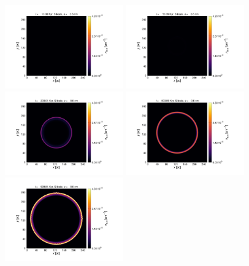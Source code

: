 \documentclass[fleqn,usenatbib]{mnras}
\begin{document}
\begin{figure}
  \includegraphics[trim=2.8cm 1.5cm 9.3cm 2.0cm, clip=true,page=2,height = 3.6cm]{Pics/Pics_A2/Density_1_00041.pdf}\hspace*{-0.05cm} 
 \includegraphics[trim=5.2cm 1.5cm 9.3cm 2.0cm, clip=true,page=2,height = 3.6cm]{Pics/Pics_A2/Density_1_00201.pdf}\hspace*{-0.05cm} 
 \includegraphics[trim=5.2cm 1.5cm 9.3cm 2.0cm, clip=true,page=2,height = 3.6cm]{Pics/Pics_A2/Density_1_00801.pdf}\hspace*{-0.05cm} 
  \includegraphics[trim=5.2cm 1.5cm 9.3cm 2.0cm, clip=true,page=2,height = 3.6cm]{Pics/Pics_A2/Density_1_02001.pdf}\hspace*{-0.05cm} 
 \includegraphics[trim=5.2cm 1.5cm 3.2cm 2.0cm, clip=true,page=2,height = 3.6cm]{Pics/Pics_A2/Density_1_04000.pdf}\\

\end{figure}
\end{document}
